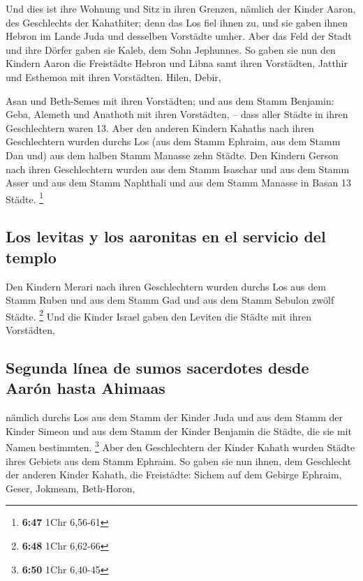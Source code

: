  Und dies ist ihre Wohnung und Sitz in ihren Grenzen,
nämlich der Kinder Aaron, des Geschlechts der Kahathiter; denn das Los
fiel ihnen zu,  und sie gaben ihnen Hebron im Lande Juda
und desselben Vorstädte umher.  Aber das Feld der Stadt
und ihre Dörfer gaben sie Kaleb, dem Sohn Jephunnes.  So
gaben sie nun den Kindern Aaron die Freistädte Hebron und Libna samt
ihren Vorstädten, Jatthir und Esthemoa mit ihren Vorstädten.
 Hilen, Debir,

 Asan und Beth-Semes mit ihren Vorstädten;
 und aus dem Stamm Benjamin: Geba, Alemeth und Anathoth
mit ihren Vorstädten, -- dass aller Städte in ihren Geschlechtern waren
13.  Aber den anderen Kindern Kahaths nach ihren
Geschlechtern wurden durchs Los (aus dem Stamm Ephraim, aus dem Stamm
Dan und) aus dem halben Stamm Manasse zehn Städte.  Den
Kindern Gerson nach ihren Geschlechtern wurden aus dem Stamm Isaschar
und aus dem Stamm Asser und aus dem Stamm Naphthali und aus dem Stamm
Manasse in Basan 13 Städte. \footnote{\textbf{6:47} 1Chr 6,56-61}

\hypertarget{los-levitas-y-los-aaronitas-en-el-servicio-del-templo}{%
\subsection{Los levitas y los aaronitas en el servicio del
templo}\label{los-levitas-y-los-aaronitas-en-el-servicio-del-templo}}

 Den Kindern Merari nach ihren Geschlechtern wurden
durchs Los aus dem Stamm Ruben und aus dem Stamm Gad und aus dem Stamm
Sebulon zwölf Städte. \footnote{\textbf{6:48} 1Chr 6,62-66}
 Und die Kinder Israel gaben den Leviten die Städte mit
ihren Vorstädten,

\hypertarget{segunda-luxednea-de-sumos-sacerdotes-desde-aaruxf3n-hasta-ahimaas}{%
\subsection{Segunda línea de sumos sacerdotes desde Aarón hasta
Ahimaas}\label{segunda-luxednea-de-sumos-sacerdotes-desde-aaruxf3n-hasta-ahimaas}}

 nämlich durchs Los aus dem Stamm der Kinder Juda und aus
dem Stamm der Kinder Simeon und aus dem Stamm der Kinder Benjamin die
Städte, die sie mit Namen bestimmten. \footnote{\textbf{6:50} 1Chr
  6,40-45}  Aber den Geschlechtern der Kinder Kahath
wurden Städte ihres Gebiets aus dem Stamm Ephraim.  So
gaben sie nun ihnen, dem Geschlecht der anderen Kinder Kahath, die
Freistädte: Sichem auf dem Gebirge Ephraim, Geser, 
Jokmeam, Beth-Horon,

